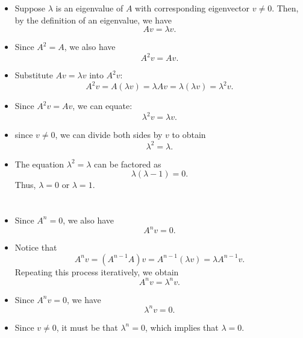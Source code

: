 \documentclass{article}
\begin{document}
\begin{itemize}
    \item Suppose \( \lambda \) is an eigenvalue of \( A \) with corresponding eigenvector \( v \neq 0 \). Then, by the definition of an eigenvalue, we have
          \[
              A v = \lambda v.
          \]

    \item Since \( A^2 = A \), we also have
          \[
              A^2 v = A v.
          \]

    \item Substitute \( A v = \lambda v \) into \( A^2 v \):
          \[
              A^2 v = A(\lambda v) = \lambda A v = \lambda (\lambda v) = \lambda^2 v.
          \]

    \item Since \( A^2 v = A v \), we can equate:
          \[
              \lambda^2 v = \lambda v.
          \]

    \item since \( v \neq 0 \), we can divide both sides by \( v \) to obtain
          \[
              \lambda^2 = \lambda.
          \]

    \item The equation \( \lambda^2 = \lambda \) can be factored as
          \[
              \lambda (\lambda - 1) = 0.
          \]
          Thus, \( \lambda = 0 \) or \( \lambda = 1 \).
\end{itemize}

\section{}
\begin{itemize}
    \item Since \( A^n = 0 \), we also have
          \[A^n v = 0.\]

    \item Notice that
          \[A^n v = (A^{n-1} A) v = A^{n-1} (\lambda v) = \lambda A^{n-1} v.\]
          Repeating this process iteratively, we obtain
          \[A^n v = \lambda^n v.\]

    \item  Since \( A^n v = 0 \), we have
          \[\lambda^n v = 0.\]

    \item Since \( v \neq 0 \), it must be that \( \lambda^n = 0 \), which implies that \( \lambda = 0 \).
\end{itemize}

\section{}
\end{document}

